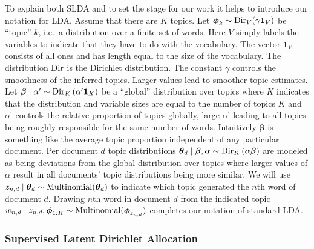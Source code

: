 To explain both SLDA and to set the stage for our work it helps to introduce our notation for LDA.  Assume that there are $K$ topics.  Let $\boldsymbol\phi_{k}\sim{\rm Dir}_{V}(\gamma\mathbf{1}_V)$ be ``topic''  $k$, i.e.~a distribution over a finite set of words.  Here $V$ simply labels the variables to indicate that they have to do with the vocabulary.  The vector $\mathbf{1}_V$ consists of all ones and has length equal to the size of the vocabulary.  The distribution ${\rm Dir}$ is the Dirichlet distribution.  The constant $\gamma$ controls the smoothness of the inferred topics.  Larger values lead to smoother topic estimates.  Let $\boldsymbol\beta\mid\alpha'\sim{\rm Dir}_{K}\left(\alpha^{\prime}\mathbf{1}_K\right)$  be a ``global'' distribution over topics where $K$ indicates that the distribution and variable sizes are equal to the number of topics $K$ and $\alpha^{\prime}$ controls the relative proportion of topics globally, large $\alpha^\prime$ leading to all topics being roughly responsible for the same number of words.  Intuitively $\boldsymbol\beta$ is something like the average topic proportion independent of any particular document.  Per document $d$ topic distributions $\boldsymbol\theta_d\mid\boldsymbol\beta,\alpha\sim{\rm Dir}_{K}\left(\alpha\boldsymbol\beta\right)$ are modeled as being deviations from the global distribution over topics where larger values of $\alpha$ result in all documents' topic distributions being more similar.  We will use  $z_{n,d}\mid\boldsymbol\theta_d\sim{\rm Multinomial}(\boldsymbol\theta_d)$ to indicate which topic generated the $n$th word of document $d$.   Drawing $n$th word in document $d$ from the  indicated topic $w_{n,d}\mid z_{n,d},\boldsymbol\phi_{1:K}\sim{\rm Multinomial}(\boldsymbol\phi_{z_{n,d}})$ completes our notation of standard LDA.    

\subsubsection{Supervised Latent Dirichlet Allocation}


